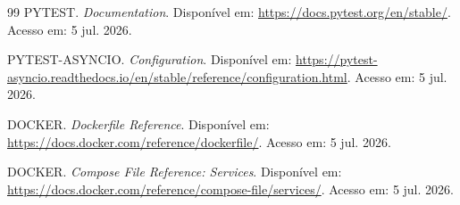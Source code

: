 \begin{thebibliography}{99}
PYTEST. \textit{Documentation}.
Disponível em: \url{https://docs.pytest.org/en/stable/}.
Acesso em: 5 jul. 2026.

PYTEST-ASYNCIO. \textit{Configuration}.
Disponível em: \url{https://pytest-asyncio.readthedocs.io/en/stable/reference/configuration.html}.
Acesso em: 5 jul. 2026.

DOCKER. \textit{Dockerfile Reference}.
Disponível em: \url{https://docs.docker.com/reference/dockerfile/}.
Acesso em: 5 jul. 2026.

DOCKER. \textit{Compose File Reference: Services}.
Disponível em: \url{https://docs.docker.com/reference/compose-file/services/}.
Acesso em: 5 jul. 2026.

\end{thebibliography}
